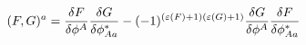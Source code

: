 \begin{equation*}
(F,G)^{a}=\frac{\delta F}{\delta \phi ^{A}}\frac{\delta G}{\delta \phi
_{Aa}^{\ast }}-(-1)^{(\varepsilon (F)+1)(\varepsilon (G)+1)}\frac{\delta G}{%
\delta \phi ^{A}}\frac{\delta F}{\delta \phi _{Aa}^{\ast }}
\end{equation*}

